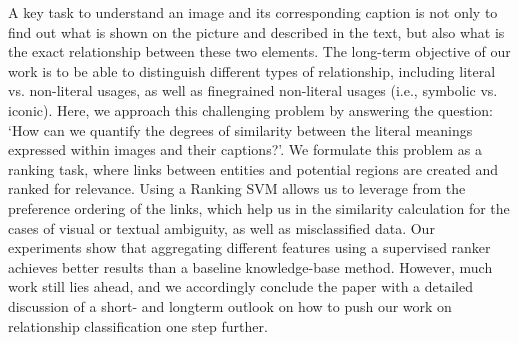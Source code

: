A key task to understand an image and its corresponding caption is not only to find out what is shown on the picture and described in the text, but also what is the exact relationship between these two elements. The long-term objective of our work is to be able to distinguish different types of relationship, including literal vs. non-literal usages, as well as finegrained non-literal usages (i.e., symbolic vs. iconic). Here, we approach this challenging problem by answering the question: ‘How can we quantify the degrees of similarity between the literal meanings expressed within images and their captions?'. We formulate this problem as a ranking task, where links between entities and potential regions are created and ranked for relevance. Using a Ranking SVM allows us to leverage from the preference ordering of the links, which help us in the similarity calculation for the cases of visual or textual ambiguity, as well as misclassified data. Our experiments show that aggregating different features using a supervised ranker achieves better results than a baseline knowledge-base method. However, much work still lies ahead, and we accordingly conclude the paper with a detailed discussion of a short- and longterm outlook on how to push our work on relationship classification one step further.
